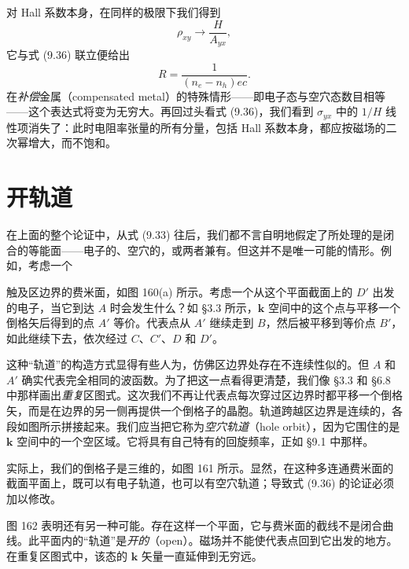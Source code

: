对 Hall 系数本身，在同样的极限下我们得到
\begin{equation*}
\rho_{xy}\to\frac{H}{A_{yx}}, \tag{9.40}
\end{equation*}
它与式 (9.36) 联立便给出
\begin{equation*}
R=\frac{1}{(n_{e}-n_{h})ec}. \tag{9.41}
\end{equation*}
在\emph{补偿}金属（compensated metal）的特殊情形——即电子态与空穴态数目相等——这个表达式将变为无穷大。再回过头看式 (9.36)，我们看到 $\sigma_{yx}$ 中的 $1/H$ 线性项消失了：此时电阻率张量的所有分量，包括 Hall 系数本身，都应按磁场的二次幂增大，而不饱和。

\section{开轨道}

在上面的整个论证中，从式 (9.33) 往后，我们都不言自明地假定了所处理的是闭合的等能面——电子的、空穴的，或两者兼有。但这并不是唯一可能的情形。例如，考虑一个


触及区边界的费米面，如图 160(a) 所示。考虑一个从这个平面截面上的 $D'$ 出发的电子，当它到达 $A$ 时会发生什么？如 §3.3 所示，$\mathbf{k}$ 空间中的这个点与平移一个倒格矢后得到的点 $A'$ 等价。代表点从 $A'$ 继续走到 $B$，然后被平移到等价点 $B'$，如此继续下去，依次经过 $C$、$C'$、$D$ 和 $D'$。

这种“轨道”的构造方式显得有些人为，仿佛区边界处存在不连续性似的。但 $A$ 和 $A'$ 确实代表完全相同的波函数。为了把这一点看得更清楚，我们像 §3.3 和 §6.8 中那样画出\emph{重复}区图式。这次我们不再让代表点每次穿过区边界时都平移一个倒格矢，而是在边界的另一侧再提供一个倒格子的晶胞。轨道跨越区边界是连续的，各段如图所示拼接起来。我们应当把它称为\emph{空穴轨道}（hole orbit），因为它围住的是 $\mathbf{k}$ 空间中的一个空区域。它将具有自己特有的回旋频率，正如 §9.1 中那样。

实际上，我们的倒格子是三维的，如图 161 所示。显然，在这种多连通费米面的截面平面上，既可以有电子轨道，也可以有空穴轨道；导致式 (9.36) 的论证必须加以修改。


图 162 表明还有另一种可能。存在这样一个平面，它与费米面的截线不是闭合曲线。此平面内的“轨道”是\emph{开的}（open）。磁场并不能使代表点回到它出发的地方。在重复区图式中，该态的 $\mathbf{k}$ 矢量一直延伸到无穷远。

